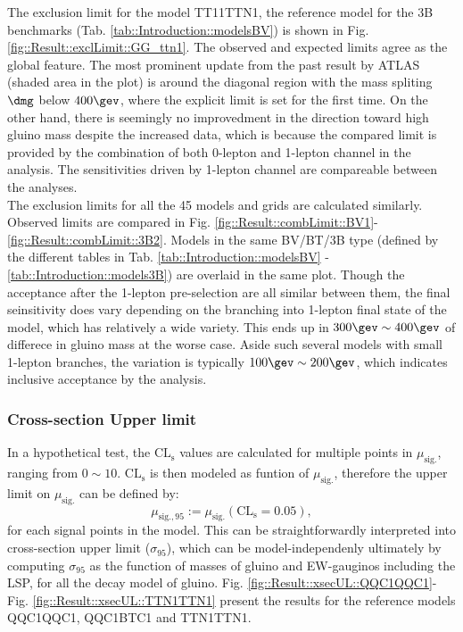 The exclusion limit for the model TT11TTN1, the reference model for the 3B benchmarks (Tab. \ref{tab::Introduction::modelsBV}) is shown in Fig. \ref{fig::Result::exclLimit::GG_ttn1}. The observed and expected limits agree as the global feature. The most prominent update from the past result \cite{strong3B_ICHEP2016_CONF} by ATLAS (shaded area in the plot) is around the diagonal region with the mass spliting $\dmg$ below $400\gev$, where the explicit limit is set for the first time. On the other hand, there is seemingly no improvedment in the direction toward high gluino mass despite the increased data, which is because the compared limit is provided by the combination of both 0-lepton and 1-lepton channel in the analysis. The sensitivities driven by 1-lepton channel are compareable between the analyses. \\


The exclusion limits for all the 45 models and grids are calculated similarly. Observed limits are compared in Fig. \ref{fig::Result::combLimit::BV1}-\ref{fig::Result::combLimit::3B2}. Models in the same BV/BT/3B type (defined by the different tables in Tab. \ref{tab::Introduction::modelsBV} - \ref{tab::Introduction::models3B}) are overlaid in the same plot. Though the acceptance after the 1-lepton pre-selection are all similar between them, the final seinsitivity does vary depending on the branching into 1-lepton final state of the model, which has relatively a wide variety. This ends up in $300\gev\sim400\gev$ of differece in gluino mass at the worse case. Aside such several models with small 1-lepton branches, the variation is typically $100\gev\sim200\gev$, which indicates inclusive acceptance by the analysis.




\clearpage
\subsubsection{Cross-section Upper limit}
In a hypothetical test, the $\mathrm{CL_s}$ values are calculated for multiple points in $\mu_{\mathrm{sig.}}$, ranging from $0\sim10$. $\mathrm{CL_s}$ is then modeled as funtion of $\mu_{\mathrm{sig.}}$, therefore the upper limit on $\mu_{\mathrm{sig.}}$ can be defined by:
$$
\mu_{\mathrm{sig.},95} := \mu_{\mathrm{sig.}}(\mathrm{CL_s}=0.05),
$$
for each signal points in the model.
This can be straightforwardly interpreted into cross-section upper limit ($\sigma_{95}$), which can be model-independenly ultimately by computing $\sigma_{95}$ as the function of masses of gluino and EW-gauginos including the LSP, for all the decay model of gluino. Fig. \ref{fig::Result::xsecUL::QQC1QQC1}-Fig. \ref{fig::Result::xsecUL::TTN1TTN1} present the results for the reference models QQC1QQC1, QQC1BTC1 and TTN1TTN1.


